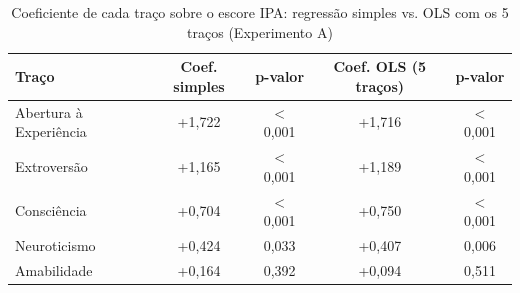 \begin{table}[htb]
    \caption{Coeficiente de cada traço sobre o escore IPA: regressão simples vs. OLS com os 5 traços (Experimento A)}
    \label{tab:aleat-impacto}
    \centering
    \small
    \begin{tabular}{lcccc}
        \toprule
        Traço & Coef. simples & p-valor & Coef. OLS (5 traços) & p-valor \\
        \midrule
        Abertura à Experiência & +1,722 & $<$ 0,001 & +1,716 & $<$ 0,001 \\
        Extroversão & +1,165 & $<$ 0,001 & +1,189 & $<$ 0,001 \\
        Consciência & +0,704 & $<$ 0,001 & +0,750 & $<$ 0,001 \\
        Neuroticismo & +0,424 & 0,033 & +0,407 & 0,006 \\
        Amabilidade & +0,164 & 0,392 & +0,094 & 0,511 \\
        \bottomrule
    \end{tabular}
\end{table}
